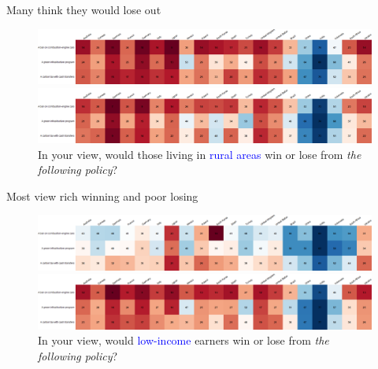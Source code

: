 \begin{frame}{Many think they would lose out}%
	\begin{figure}[h!]
	\centering
	\caption{%
	Do you think that \textcolor{blue}{financially your household} would win or lose from \textit{the policy}?}
	\includegraphics[width=\textwidth]{../figures/country_comparison/policies_win_lose_self_positive_countries.png}
	\vspace{-.1cm}
	\centering
	\caption{%
	In your view, would those living in \textcolor{blue}{rural areas} win or lose from \textit{the following policy}?}
	\includegraphics[width=\textwidth]{../figures/country_comparison/policies_win_lose_rural_positive_countries.png}
	\end{figure}
\end{frame}
	
\begin{frame}{Most view rich winning and poor losing}%
	\begin{figure}[h!]
	\centering
	\caption{%
	In your view, would \textcolor{blue}{high-income} earners win or lose from \textit{the following policy}?}
	\includegraphics[width=\textwidth]{../figures/country_comparison/policies_win_lose_rich_positive_countries.png}
	\vspace{-.1cm}
	\centering
	\caption{%
	In your view, would \textcolor{blue}{low-income} earners win or lose from \textit{the following policy}?}
	\includegraphics[width=\textwidth]{../figures/country_comparison/policies_win_lose_poor_positive_countries.png}
	\end{figure}
\end{frame}
	

